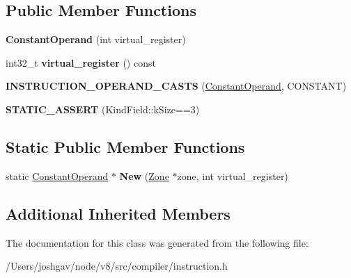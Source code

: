 \subsection*{Public Member Functions}
\begin{DoxyCompactItemize}
\item 
{\bfseries Constant\+Operand} (int virtual\+\_\+register)\hypertarget{classv8_1_1internal_1_1compiler_1_1_constant_operand_a42e57d2fe0940dcfe93ae1effd687bf7}{}\label{classv8_1_1internal_1_1compiler_1_1_constant_operand_a42e57d2fe0940dcfe93ae1effd687bf7}

\item 
int32\+\_\+t {\bfseries virtual\+\_\+register} () const \hypertarget{classv8_1_1internal_1_1compiler_1_1_constant_operand_aca7d1b8f52802effb601c216cc797eed}{}\label{classv8_1_1internal_1_1compiler_1_1_constant_operand_aca7d1b8f52802effb601c216cc797eed}

\item 
{\bfseries I\+N\+S\+T\+R\+U\+C\+T\+I\+O\+N\+\_\+\+O\+P\+E\+R\+A\+N\+D\+\_\+\+C\+A\+S\+TS} (\hyperlink{classv8_1_1internal_1_1compiler_1_1_constant_operand}{Constant\+Operand}, C\+O\+N\+S\+T\+A\+NT)\hypertarget{classv8_1_1internal_1_1compiler_1_1_constant_operand_a20b1c2502d9b6613738d3ccc8f4e81b3}{}\label{classv8_1_1internal_1_1compiler_1_1_constant_operand_a20b1c2502d9b6613738d3ccc8f4e81b3}

\item 
{\bfseries S\+T\+A\+T\+I\+C\+\_\+\+A\+S\+S\+E\+RT} (Kind\+Field\+::k\+Size==3)\hypertarget{classv8_1_1internal_1_1compiler_1_1_constant_operand_a17c945feeae866b585e30b71bb09dfe2}{}\label{classv8_1_1internal_1_1compiler_1_1_constant_operand_a17c945feeae866b585e30b71bb09dfe2}

\end{DoxyCompactItemize}
\subsection*{Static Public Member Functions}
\begin{DoxyCompactItemize}
\item 
static \hyperlink{classv8_1_1internal_1_1compiler_1_1_constant_operand}{Constant\+Operand} $\ast$ {\bfseries New} (\hyperlink{classv8_1_1internal_1_1_zone}{Zone} $\ast$zone, int virtual\+\_\+register)\hypertarget{classv8_1_1internal_1_1compiler_1_1_constant_operand_a39e76be0338ef8835f22f2c05c82c6be}{}\label{classv8_1_1internal_1_1compiler_1_1_constant_operand_a39e76be0338ef8835f22f2c05c82c6be}

\end{DoxyCompactItemize}
\subsection*{Additional Inherited Members}


The documentation for this class was generated from the following file\+:\begin{DoxyCompactItemize}
\item 
/\+Users/joshgav/node/v8/src/compiler/instruction.\+h\end{DoxyCompactItemize}
